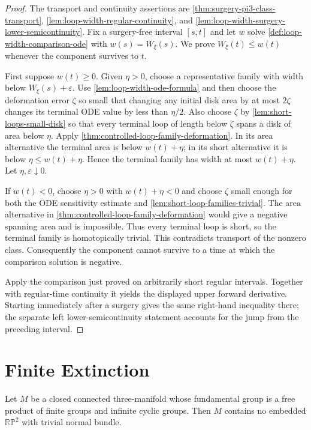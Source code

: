 \begin{proof}
The transport and continuity assertions are
\ref{thm:surgery-pi3-class-transport},
\ref{lem:loop-width-regular-continuity}, and
\ref{lem:loop-width-surgery-lower-semicontinuity}.  Fix a surgery-free
interval $[s,t]$ and let $w$ solve
\ref{def:loop-width-comparison-ode} with $w(s)=W_\xi(s)$.  We prove
$W_\xi(t)\le w(t)$ whenever the component survives to $t$.

First suppose $w(t)\ge0$.  Given $\eta>0$, choose a representative family
with width below $W_\xi(s)+\varepsilon$.  Use
\ref{lem:loop-width-ode-formula} and then choose the deformation error
$\zeta$ so small that changing any initial disk area by at most
$2\zeta$ changes its terminal ODE value by less than $\eta/2$.  Also choose
$\zeta$ by \ref{lem:short-loops-small-disk} so that every terminal loop of
length below $\zeta$ spans a disk of area below $\eta$.  Apply
\ref{thm:controlled-loop-family-deformation}.  In its area alternative the
terminal area is below $w(t)+\eta$; in its short alternative it is below
$\eta\le w(t)+\eta$.  Hence the terminal family has width at most
$w(t)+\eta$.  Let $\eta,\varepsilon\downarrow0$.

If $w(t)<0$, choose $\eta>0$ with $w(t)+\eta<0$ and choose $\zeta$ small
enough for both the ODE sensitivity estimate and
\ref{lem:short-loop-families-trivial}.  The area alternative in
\ref{thm:controlled-loop-family-deformation} would give a negative spanning
area and is impossible.  Thus every terminal loop is short, so the terminal
family is homotopically trivial.  This contradicts transport of the nonzero
class.  Consequently the component cannot survive to a time at which the
comparison solution is negative.

Apply the comparison just proved on arbitrarily short regular intervals.
Together with regular-time continuity it yields the displayed upper forward
derivative.  Starting immediately after a surgery gives the same right-hand
inequality there; the separate left lower-semicontinuity statement accounts
for the jump from the preceding interval.
\end{proof}

\section{Finite Extinction}

\begin{theorem}
\label{thm:free-product-excludes-two-sided-projective-plane}
\notready
Let $M$ be a closed connected three-manifold whose fundamental group is a
free product of finite groups and infinite cyclic groups.  Then $M$ contains
no embedded $\mathbb{RP}^2$ with trivial normal bundle.
\end{theorem}


